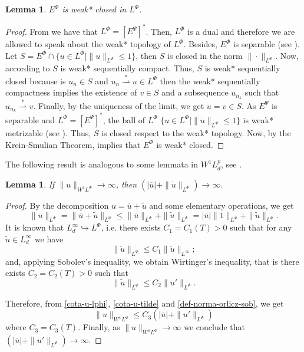 \documentclass[twoside]{article}
\newtheorem{lem}[thm]{Lemma}
\theoremstyle{remark}
\newcommand{\orlnor}{\|_{L^{\Phi}}}
\newcommand{\lphi}{L^{\Phi}}
\newcommand{\ephi}{E^{\Phi}}
\newcommand{\sobnor}{\|_{W^{1}\lphi}}
\renewcommand{\leq}{\leqslant}
\newcommand{\epsi}{E^{\Psi}}
\begin{document}
\begin{lem}\label{lem:deb*cerrado}
$\ephi$ is weak* closed in $\lphi$.
\end{lem}


\begin{proof}
From \cite[Thm. 7, p. 110]{rao1991theory} we have that $\lphi=\left[\epsi\right]^*
$.
Then, $\lphi$ is a dual and therefore we are allowed to speak about the weak* topology of $\lphi$.
Besides, $\ephi
$ is separable (see \cite[Thm. 1, p. 87]{rao1991theory}).
Let $S=\ephi\cap \{u \in \lphi|\|u\orlnor\leq 1\}$, then $S$ is closed in the norm $\|\cdot\orlnor$. Now, according to \cite[Cor. 5, p. 148]{rao1991theory} $S$ is weak* sequentially compact. Thus, $S$ is weak* sequentially closed because
is $u_n\in S$ and
$u_n \overset{*}{\rightharpoonup}u \in \lphi$ then  the weak* sequentially compactness implies the existence of $v \in S$ and a subsequence $u_{n_k}$ such that
$u_{n_k}\overset{*}{\rightharpoonup}v$. Finally, by the uniqueness of   the limit, we get
$u=v\in S$.
As $\epsi$ is separable and $\lphi=\left[\epsi\right]^*$, the ball of $\lphi$ $\{u \in \lphi | \|u\orlnor\leq 1\}$ is  weak* metrizable (see \cite[Thm. 5.1, p. 138]{Conway1977}).
Thus, $S$ is closed respect to  the weak* topology. Now, by the Krein-Smulian Theorem, \cite[Cor. 12.6, p. 165]{Conway1977} implies that $\ephi$ is weak* closed.
\end{proof}

The following result is analogous to some lemmata in $W^1L^p_d$, see \cite{xu2007some}.
\begin{lem}\label{infinito-a-prom-upunto}
If $\|u\sobnor\to \infty$, then $(|\overline{u}|+\|\dot{u}\orlnor)\to \infty$.
\end{lem}

\begin{proof}
By the decomposition $u=\overline{u}+\tilde{u}$ and some elementary operations,
we get
\begin{equation}\label{cota-u-lphi}
\|u\orlnor=
\|\overline{u}+\tilde{u}\orlnor\leq
\|\overline{u}\orlnor+\|\tilde{u}\orlnor=
|\overline{u}|\|1\orlnor+\|\tilde{u}\orlnor.
\end{equation}
It is known that $L^{\infty}_d\hookrightarrow\lphi$, i.e.
there exists $C_1=C_1(T)>0$ such that for any $\tilde{u}\in L^{\infty}_d$ we have
\[
\|\tilde{u}\orlnor
\leq
C_1 \|\tilde{u}\|_{L^{\infty}};
\]
and, applying  Sobolev's inequality,  we obtain Wirtinger's inequality, that is there exists $C_2=C_2(T)>0$ such that
\begin{equation}\label{cota-u-tilde}
\|\tilde{u}\orlnor
\leq
C_2\|u'\orlnor.
\end{equation}

Therefore, from \eqref{cota-u-lphi}, \eqref{cota-u-tilde} and \eqref{def-norma-orlicz-sob},
we get
\[
\|u\sobnor\leq
C_3(|\overline{u}|+\|u'\orlnor)
\]
where $C_3=C_3(T)$. Finally, as $\|u\sobnor\to \infty$ we conclude that
$(|\overline{u}|+\|u'\orlnor)\to \infty$.
\end{proof}
\end{document}
